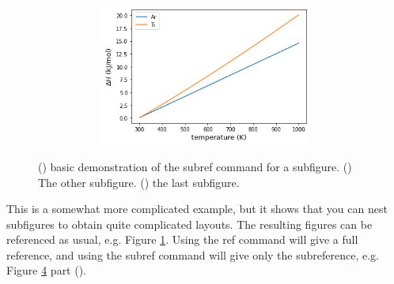 \begin{figure}[H]
\begin{subfigure}{0.3\textwidth}
\begin{subfigure}{\textwidth}
            \caption{}
            \label{fig:example2}
        \end{subfigure}
        \begin{subfigure}{\textwidth}
            \centering
            \includegraphics[width=\textwidth,keepaspectratio]{figures/DeltaH.png}
            \caption{}
            \label{fig:example3}
        \end{subfigure}
    \end{subfigure}
    \caption{
    () basic demonstration of the subref command for a subfigure.
    () The other subfigure.
    () the last subfigure.
    }
    \label{fig:example-main}
\end{figure}
This is a somewhat more complicated example, but it shows that you can nest subfigures to obtain quite complicated layouts.
The resulting figures can be referenced as usual, e.g. Figure \ref{fig:example2}.
Using the ref command will give a full reference, and using the subref command will give only the subreference, e.g. Figure \ref{fig:example-main} part ().
%
